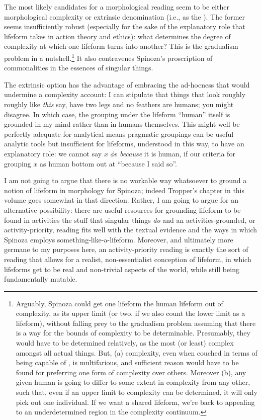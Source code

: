 \documentclass{article}
\newcommand{\dash}{\unskip{—}}
\begin{document}
The most likely candidates for a morphological reading seem to be either morphological complexity or extrinsic denomination (i.e., as the ). The former seems insufficiently robust (especially for the sake of the explanatory role that lifeform takes in action theory and ethics): what determines the degree of complexity at which one lifeform turns into another? This is the gradualism problem in a nutshell.\footnote{Arguably, Spinoza could get one lifeform \dash the human lifeform \dash out of complexity, as its upper limit (or two, if we also count the lower limit as a lifeform), without falling prey to the gradualism problem \dash assuming that there is a way for the bounds of complexity to be determinable. Presumably, they would have to be determined relatively, as the most (or least) complex amongst all actual things. But, (a) complexity, even when couched in terms of being capable of , is multifarious, and sufficient reason would have to be found for preferring one form of complexity over others. Moreover (b), any given human is going to differ to some extent in complexity from any other, such that, even if an upper limit to complexity can be determined, it will only pick out one individual. If we want a shared lifeform, we're back to appealing to an underdetermined region in the complexity continuum.} It also contravenes Spinoza's proscription of commonalities in the essences of singular things.

The extrinsic option has the advantage of embracing the ad-hocness that would undermine a complexity account: I can stipulate that things that look roughly roughly like \emph{this} \dash say, have two legs and no feathers \dash are humans; you might disagree. In which case, the grouping under the lifeform \enquote{human} itself is grounded in my mind rather than in humans themselves. This might well be perfectly adequate for analytical means \dash pragmatic groupings can be useful analytic tools \dash but insufficient for lifeforms, understood in this way, to have an explanatory role: we cannot say $x$ $\phi$s \emph{because} it is human, if our criteria for grouping $x$ as human bottom out at \enquote{because I said so}.

I am not going to argue that there is no workable way whatsoever to ground a notion of lifeform in morphology for Spinoza; indeed Tropper's chapter in this volume goes somewhat in that direction. Rather, I am going to argue for an alternative possibility: there are useful resources for grounding lifeform to be found in activities \dash the stuff that singular things \emph{do} \dash and an activities-grounded, or activity-priority, reading fits well with the textual evidence and the ways in which Spinoza employs something-like-a-lifeform. Moreover, and ultimately more germane to my purposes here, an activity-priority reading is exactly the sort of reading that allows for a realist, non-essentialist conception of lifeform, in which lifeforms get to be real and non-trivial aspects of the world, while still being fundamentally mutable.
\end{document}
